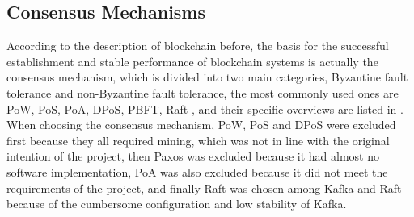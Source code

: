 \subsection{Consensus Mechanisms}
According to the description of blockchain before, the basis for the successful establishment and stable performance of blockchain systems is actually the consensus mechanism, which is divided into two main categories, Byzantine fault tolerance and non-Byzantine fault tolerance, the most commonly used ones are PoW, PoS, PoA, DPoS, PBFT, Raft \cite{Mingxiao2017}, and their specific overviews are listed in . When choosing the consensus mechanism, PoW, PoS and DPoS were excluded first because they all required mining, which was not in line with the original intention of the project, then Paxos was excluded because it had almost no software implementation, PoA was also excluded because it did not meet the requirements of the project, and finally Raft was chosen among Kafka and Raft because of the cumbersome configuration and low stability of Kafka.

